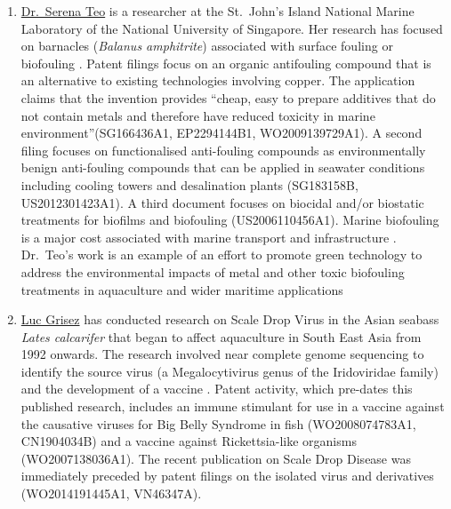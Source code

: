 \documentclass[]{book}
\theoremstyle{definition}
\theoremstyle{definition}
\theoremstyle{definition}
\theoremstyle{remark}
\begin{document}
\begin{enumerate}
\def\labelenumi{\arabic{enumi}.}
\setcounter{enumi}{5}
\item
  \href{http://sjinml.nus.edu.sg/profile-serena-teo/}{Dr.~Serena Teo} is
  a researcher at the St.~John's Island National Marine Laboratory of
  the National University of Singapore. Her research has focused on
  barnacles (\emph{Balanus amphitrite}) associated with surface fouling
  or biofouling \citep{Phang_2009, Guo_2011, Petrone_2013}. Patent
  filings focus on an organic antifouling compound that is an
  alternative to existing technologies involving copper. The application
  claims that the invention provides ``cheap, easy to prepare additives
  that do not contain metals and therefore have reduced toxicity in
  marine environment''(SG166436A1, EP2294144B1, WO2009139729A1). A
  second filing focuses on functionalised anti-fouling compounds as
  environmentally benign anti-fouling compounds that can be applied in
  seawater conditions including cooling towers and desalination plants
  (SG183158B, US2012301423A1). A third document focuses on biocidal
  and/or biostatic treatments for biofilms and biofouling
  (US2006110456A1). Marine biofouling is a major cost associated with
  marine transport and infrastructure \citep{Callow_2011}. Dr.~Teo's
  work is an example of an effort to promote green technology to address
  the environmental impacts of metal and other toxic biofouling
  treatments in aquaculture and wider maritime applications
  \citep{Callow_2011, Floerl_2016}
\item
  \href{https://nl.linkedin.com/in/luc-grisez-981a455}{Luc Grisez} has
  conducted research on Scale Drop Virus in the Asian seabass
  \emph{Lates calcarifer} that began to affect aquaculture in South East
  Asia from 1992 onwards. The research involved near complete genome
  sequencing to identify the source virus (a Megalocytivirus genus of
  the Iridoviridae family) and the development of a vaccine
  \citep{de_Groof_2015}. Patent activity, which pre-dates this published
  research, includes an immune stimulant for use in a vaccine against
  the causative viruses for Big Belly Syndrome in fish (WO2008074783A1,
  CN1904034B) and a vaccine against Rickettsia-like organisms
  (WO2007138036A1). The recent publication on Scale Drop Disease was
  immediately preceded by patent filings on the isolated virus and
  derivatives (WO2014191445A1, VN46347A).
\end{enumerate}
\end{document}
